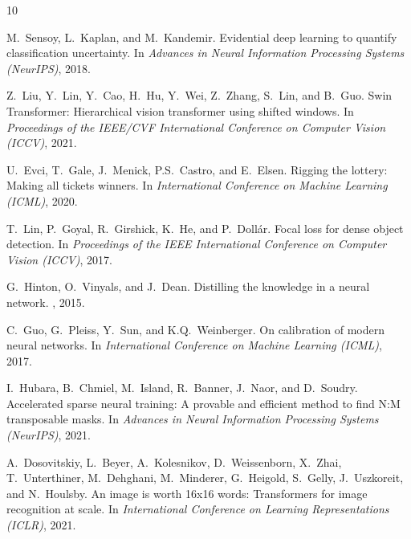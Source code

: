 \documentclass[11pt]{article}
\begin{document}
\begin{thebibliography}{10}

M.~Sensoy, L.~Kaplan, and M.~Kandemir.
\newblock Evidential deep learning to quantify classification uncertainty.
\newblock In {\em Advances in Neural Information Processing Systems (NeurIPS)}, 2018.

Z.~Liu, Y.~Lin, Y.~Cao, H.~Hu, Y.~Wei, Z.~Zhang, S.~Lin, and B.~Guo.
\newblock Swin Transformer: Hierarchical vision transformer using shifted windows.
\newblock In {\em Proceedings of the IEEE/CVF International Conference on Computer Vision (ICCV)}, 2021.

U.~Evci, T.~Gale, J.~Menick, P.S.~Castro, and E.~Elsen.
\newblock Rigging the lottery: Making all tickets winners.
\newblock In {\em International Conference on Machine Learning (ICML)}, 2020.

T.~Lin, P.~Goyal, R.~Girshick, K.~He, and P.~Doll{\'a}r.
\newblock Focal loss for dense object detection.
\newblock In {\em Proceedings of the IEEE International Conference on Computer Vision (ICCV)}, 2017.

G.~Hinton, O.~Vinyals, and J.~Dean.
\newblock Distilling the knowledge in a neural network.
, 2015.

C.~Guo, G.~Pleiss, Y.~Sun, and K.Q.~Weinberger.
\newblock On calibration of modern neural networks.
\newblock In {\em International Conference on Machine Learning (ICML)}, 2017.

I.~Hubara, B.~Chmiel, M.~Island, R.~Banner, J.~Naor, and D.~Soudry.
\newblock Accelerated sparse neural training: A provable and efficient method to find N:M transposable masks.
\newblock In {\em Advances in Neural Information Processing Systems (NeurIPS)}, 2021.

A.~Dosovitskiy, L.~Beyer, A.~Kolesnikov, D.~Weissenborn, X.~Zhai, T.~Unterthiner, M.~Dehghani, M.~Minderer, G.~Heigold, S.~Gelly, J.~Uszkoreit, and N.~Houlsby.
\newblock An image is worth 16x16 words: Transformers for image recognition at scale.
\newblock In {\em International Conference on Learning Representations (ICLR)}, 2021.


\end{thebibliography}
\end{document}
